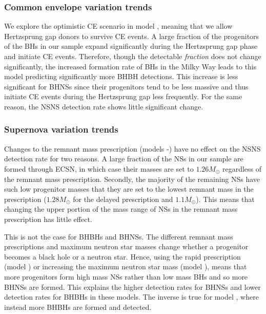 \subsubsection{Common envelope variation trends}\label{sec:detection_rate_CE_trends}


We explore the optimistic CE scenario in model \modOpt{}, meaning that we allow Hertzsprung gap donors to survive CE events. A large fraction of the progenitors of the BHs in our sample expand significantly during the Hertzsprung gap phase and initiate CE events. Therefore, though the detectable \textit{fraction} does not change significantly, the increased formation rate of BHs in the Milky Way leads to this model predicting significantly more BHBH detections. This increase is less significant for BHNSs since their progenitors tend to be less massive and thus initiate CE events during the Hertzsprung gap less frequently. For the same reason, the NSNS detection rate shows little significant change.

\subsubsection{Supernova variation trends}

Changes to the remnant mass prescription (models \modRapid{}-\modNSHigh{}) have no effect on the NSNS detection rate for two reasons. A large fraction of the NSs in our sample are formed through ECSN, in which case their masses are set to $1.26 \unit{M_\odot}$ regardless of the remnant mass prescription. Secondly, the majority of the remaining NSs have such low progenitor masses that they are set to the lowest remnant mass in the prescription ($1.28 \unit{M_\odot}$ for the delayed prescription and $1.1 \unit{M_\odot}$). This means that changing the upper portion of the mass range of NSs in the remnant mass prescription has little effect.

This is not the case for BHBHs and BHNSs. The different remnant mass prescriptions and maximum neutron star masses change whether a progenitor becomes a black hole or a neutron star. Hence, using the rapid prescription (model \modRapid{}) or increasing the maximum neutron star mass (model \modNSHigh{}), means that more progenitors form high mass NSs rather than low mass BHs and so more BHNSs are formed. This explains the higher detection rates for BHNSs and lower detection rates for BHBHs in these models. The inverse is true for model \modNSLow{}, where instead more BHBHs are formed and detected.

